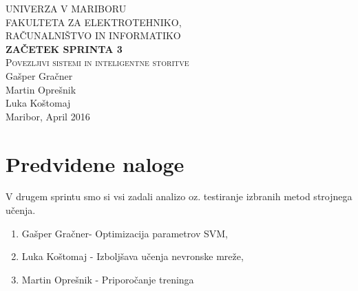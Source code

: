 \documentclass[a4paper,11pt]{article}
\begin{document}
\begin{titlepage}


\newcommand{\HRule}{\rule{\linewidth}{0.5mm}} %

\center %
 

\textsc{ UNIVERZA V MARIBORU\\ FAKULTETA ZA ELEKTROTEHNIKO,\\RAČUNALNIŠTVO IN INFORMATIKO}\\[5cm] %

{ \huge \bfseries \textbf{ZAČETEK SPRINTA 3}}\\[0.4cm] %
\textsc{\large Povezljivi sistemi in inteligentne storitve}\\[5cm] %

{\large Gašper Gračner}\\[0.4cm]
{\large Martin Oprešnik}\\[0.4cm]
{\large Luka Koštomaj}\\[0.4cm] 

\vfill %
{\large Maribor, April 2016}\\[3cm] %
\end{titlepage}
\newpage


\section{Predvidene naloge}
V drugem sprintu smo si vsi zadali analizo oz. testiranje izbranih metod strojnega učenja.
	\begin{enumerate}
		\item{Gašper Gračner- Optimizacija parametrov SVM,}
		\item{Luka Koštomaj - Izboljšava učenja nevronske mreže,}
		\item{Martin Oprešnik - Priporočanje treninga}
	\end{enumerate}
	
\end{document}
